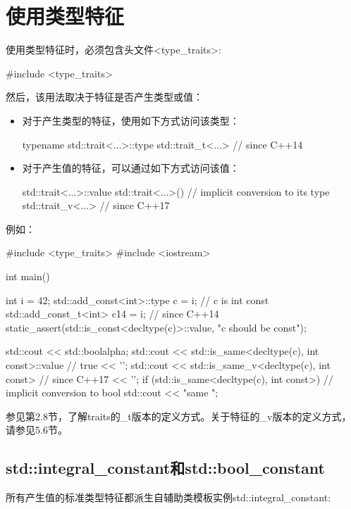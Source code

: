 \section{使用类型特征}

使用类型特征时，必须包含头文件<type\_traits>:

\begin{cpp}
#include <type_traits>
\end{cpp}

然后，该用法取决于特征是否产生类型或值：

\begin{itemize}
\item 
对于产生类型的特征，使用如下方式访问该类型：
\begin{cpp}
typename std::trait<...>::type
std::trait_t<...> // since C++14
\end{cpp}

\item 
对于产生值的特征，可以通过如下方式访问该值：
\begin{cpp}
std::trait<...>::value
std::trait<...>() // implicit conversion to its type
std::trait_v<...> // since C++17
\end{cpp}
\end{itemize}

例如：

\begin{cpp}
#include <type_traits>
#include <iostream>

int main() {
	int i = 42;
	std::add_const<int>::type c = i; // c is int const
	std::add_const_t<int> c14 = i; // since C++14
	static_assert(std::is_const<decltype(c)>::value, "c should be const");
	
	std::cout << std::boolalpha;
	std::cout << std::is_same<decltype(c), int const>::value // true
			<< '\n';
	std::cout << std::is_same_v<decltype(c), int const> // since C++17
			<< '\n';
	if (std::is_same<decltype(c), int const>{}) { // implicit conversion to bool
		std::cout << "same \n";
	}
}
\end{cpp}

参见第2.8节，了解traits的\_t版本的定义方式。关于特征的\_v版本的定义方式，请参见5.6节。

\subsection{std::integral\_constant和std::bool\_constant}

所有产生值的标准类型特征都派生自辅助类模板实例std::integral\_constant:

